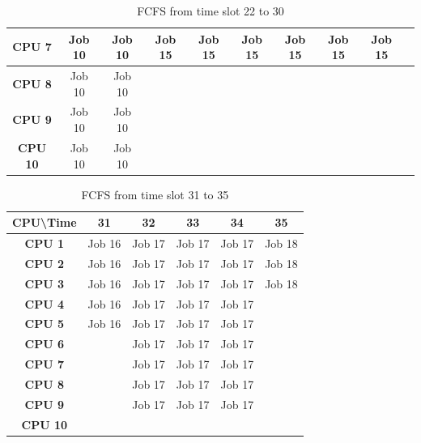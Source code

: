 \documentclass[11pt]{article}
\begin{document}
\begin{table}[]
\begin{tabular}{|c|c|c|c|c|c|c|c|c|c|}
\textbf{CPU 7}                   & Job 10      & Job 10      & Job 15      & Job 15      & Job 15      & Job 15      & Job 15      & Job 15      &             \\ \hline
\textbf{CPU 8}                   & Job 10      & Job 10      &             &             &             &             &             &             &             \\ \hline
\textbf{CPU 9}                   & Job 10      & Job 10      &             &             &             &             &             &             &             \\ \hline
\textbf{CPU 10}                  & Job 10      & Job 10      &             &             &             &             &             &             &             \\ \hline
\end{tabular}
\caption{\label{FCFS22}FCFS from time slot 22 to 30}
\end{table}

\begin{table}
\centering
\begin{tabular}{|c|c|c|c|c|c|}
\hline
\textbf{CPU\textbackslash{}Time} & \textbf{31} & \textbf{32} & \textbf{33} & \textbf{34} & \textbf{35} \\ \hline
\textbf{CPU 1}                   & Job 16      & Job 17      & Job 17      & Job 17      & Job 18      \\ \hline
\textbf{CPU 2}                   & Job 16      & Job 17      & Job 17      & Job 17      & Job 18      \\ \hline
\textbf{CPU 3}                   & Job 16      & Job 17      & Job 17      & Job 17      & Job 18      \\ \hline
\textbf{CPU 4}                   & Job 16      & Job 17      & Job 17      & Job 17      &             \\ \hline
\textbf{CPU 5}                   & Job 16      & Job 17      & Job 17      & Job 17      &             \\ \hline
\textbf{CPU 6}                   &             & Job 17      & Job 17      & Job 17      &             \\ \hline
\textbf{CPU 7}                   &             & Job 17      & Job 17      & Job 17      &             \\ \hline
\textbf{CPU 8}                   &             & Job 17      & Job 17      & Job 17      &             \\ \hline
\textbf{CPU 9}                   &             & Job 17      & Job 17      & Job 17      &             \\ \hline
\textbf{CPU 10}                  &             &             &             &             &             \\ \hline
\end{tabular}
\caption{\label{FCFS31}FCFS from time slot 31 to 35}
\end{table}
\end{document}
